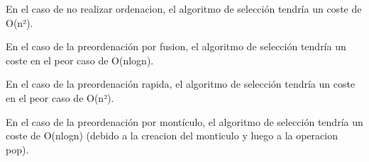 En el caso de no realizar ordenacion, el algoritmo de selección tendría un coste de O(n²).

En el caso de la preordenación por fusion, el algoritmo de selección tendría un coste en el peor caso de O(nlogn).

En el caso de la preordenación rapida, el algoritmo de selección tendría un coste en el peor caso de O(n²).

En el caso de la preordenación por montículo, el algoritmo de selección tendría un coste de O(nlogn) (debido a la creacion del monticulo y luego a la operacion pop).
